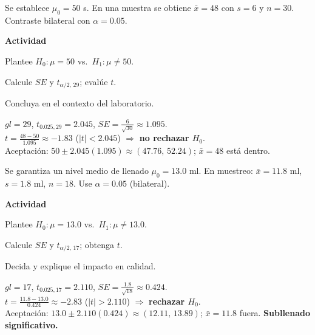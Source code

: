 \begin{ejercicio}[Tiempo de verificación en metrología (n=30)]
Se establece $\mu_0=50$ s. En una muestra se obtiene $\bar{x}=48$ con $s=6$ y $n=30$.
Contraste bilateral con $\alpha=0.05$.


\textbf{Actividad}
\begin{pasos}
  \item Plantee $H_0:\mu=50$ vs.\ $H_1:\mu\neq50$.
  \item Calcule $SE$ y $t_{\alpha/2,\,29}$; evalúe $t$.
  \item Concluya en el contexto del laboratorio.
\end{pasos}

\begin{clave}
$gl=29$, \; $t_{0.025,29}=2.045$, \;
$SE=\tfrac{6}{\sqrt{30}}\approx 1.095$.\\
$t=\frac{48-50}{1.095}\approx -1.83$ \; ($|t|<2.045$) $\Rightarrow$ \textbf{no rechazar $H_0$}.\\
Aceptación: $50\pm 2.045(1.095)\approx (47.76,\,52.24)$; $\bar{x}=48$ está dentro.
\end{clave}
\end{ejercicio}


\begin{ejercicio}[Nivel de llenado en envasado (n=18)]
Se garantiza un nivel medio de llenado $\mu_0=13.0$ ml. En muestreo: $\bar{x}=11.8$ ml, $s=1.8$ ml, $n=18$.
Use $\alpha=0.05$ (bilateral).


\textbf{Actividad}
\begin{pasos}
  \item Plantee $H_0:\mu=13.0$ vs.\ $H_1:\mu\neq13.0$.
  \item Calcule $SE$ y $t_{\alpha/2,\,17}$; obtenga $t$.
  \item Decida y explique el impacto en calidad.
\end{pasos}

\begin{clave}
$gl=17$, \; $t_{0.025,17}=2.110$, \;
$SE=\tfrac{1.8}{\sqrt{18}}\approx 0.424$.\\
$t=\frac{11.8-13.0}{0.424}\approx -2.83$ \; ($|t|>2.110$) $\Rightarrow$ \textbf{rechazar $H_0$}.\\
Aceptación: $13.0\pm 2.110(0.424)\approx (12.11,\,13.89)$; $\bar{x}=11.8$ fuera. \textbf{Subllenado significativo.}
\end{clave}
\end{ejercicio}